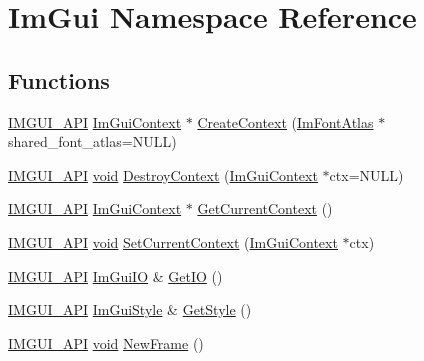 \hypertarget{namespaceImGui}{}\section{Im\+Gui Namespace Reference}
\label{namespaceImGui}
\subsection*{Functions}
\begin{DoxyCompactItemize}
\item 
\hyperlink{imgui_8h_a43829975e84e45d1149597467a14bbf5}{I\+M\+G\+U\+I\+\_\+\+A\+PI} \hyperlink{structImGuiContext}{Im\+Gui\+Context} $\ast$ \hyperlink{namespaceImGui_a4ff6c9ad05a0eba37ce1b5ff1607810a}{Create\+Context} (\hyperlink{structImFontAtlas}{Im\+Font\+Atlas} $\ast$shared\+\_\+font\+\_\+atlas=N\+U\+LL)
\item 
\hyperlink{imgui_8h_a43829975e84e45d1149597467a14bbf5}{I\+M\+G\+U\+I\+\_\+\+A\+PI} \hyperlink{imgui__impl__opengl3__loader_8h_ac668e7cffd9e2e9cfee428b9b2f34fa7}{void} \hyperlink{namespaceImGui_ab9132deece575023170cd8e681d0581d}{Destroy\+Context} (\hyperlink{structImGuiContext}{Im\+Gui\+Context} $\ast$ctx=N\+U\+LL)
\item 
\hyperlink{imgui_8h_a43829975e84e45d1149597467a14bbf5}{I\+M\+G\+U\+I\+\_\+\+A\+PI} \hyperlink{structImGuiContext}{Im\+Gui\+Context} $\ast$ \hyperlink{namespaceImGui_af557a6de5538099a0f6047eb994bbf42}{Get\+Current\+Context} ()
\item 
\hyperlink{imgui_8h_a43829975e84e45d1149597467a14bbf5}{I\+M\+G\+U\+I\+\_\+\+A\+PI} \hyperlink{imgui__impl__opengl3__loader_8h_ac668e7cffd9e2e9cfee428b9b2f34fa7}{void} \hyperlink{namespaceImGui_a289dbbbffdadcf1231821d97a7c4a9be}{Set\+Current\+Context} (\hyperlink{structImGuiContext}{Im\+Gui\+Context} $\ast$ctx)
\item 
\hyperlink{imgui_8h_a43829975e84e45d1149597467a14bbf5}{I\+M\+G\+U\+I\+\_\+\+A\+PI} \hyperlink{structImGuiIO}{Im\+Gui\+IO} \& \hyperlink{namespaceImGui_a3179e560812f878f3961ce803a5d9302}{Get\+IO} ()
\item 
\hyperlink{imgui_8h_a43829975e84e45d1149597467a14bbf5}{I\+M\+G\+U\+I\+\_\+\+A\+PI} \hyperlink{structImGuiStyle}{Im\+Gui\+Style} \& \hyperlink{namespaceImGui_abafef4bb3e3654efd96a47b2e22870a7}{Get\+Style} ()
\item 
\hyperlink{imgui_8h_a43829975e84e45d1149597467a14bbf5}{I\+M\+G\+U\+I\+\_\+\+A\+PI} \hyperlink{imgui__impl__opengl3__loader_8h_ac668e7cffd9e2e9cfee428b9b2f34fa7}{void} \hyperlink{namespaceImGui_ab3f1fc018f903b7ad79fd10663375774}{New\+Frame} ()

\end{DoxyCompactItemize}

